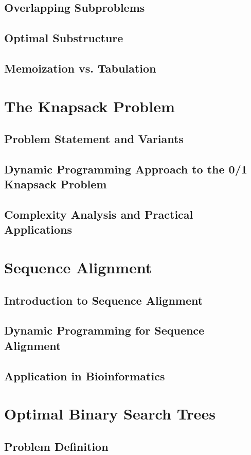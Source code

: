 \documentclass[12pt]{book} %
\begin{document}
\subsection{Overlapping Subproblems}
\subsection{Optimal Substructure}
\subsection{Memoization vs. Tabulation}

\section{The Knapsack Problem}
\subsection{Problem Statement and Variants}
\subsection{Dynamic Programming Approach to the 0/1 Knapsack Problem}
\subsection{Complexity Analysis and Practical Applications}

\section{Sequence Alignment}
\subsection{Introduction to Sequence Alignment}
\subsection{Dynamic Programming for Sequence Alignment}
\subsection{Application in Bioinformatics}

\section{Optimal Binary Search Trees}
\subsection{Problem Definition}
\end{document}
